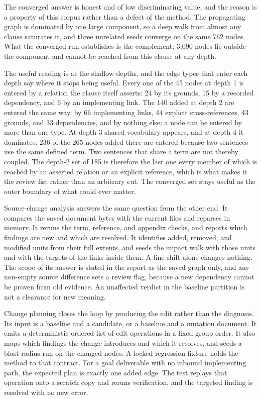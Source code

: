 The converged answer is honest and of low discriminating value, and the reason is a property of this corpus rather than a defect of the method. The propagating graph is dominated by one large component, so a deep walk from almost any clause saturates it, and three unrelated seeds converge on the same 762 nodes. What the converged run establishes is the complement: 3{,}090 nodes lie outside the component and cannot be reached from this clause at any depth.

The useful reading is at the shallow depths, and the edge types that enter each depth say where it stops being useful. Every one of the 45 nodes at depth 1 is entered by a relation the clause itself asserts: 24 by its grounds, 15 by a recorded dependency, and 6 by an implementing link. The 140 added at depth 2 are entered the same way, by 66 implementing links, 44 explicit cross-references, 43 grounds, and 33 dependencies, and by nothing else; a node can be entered by more than one type. At depth 3 shared vocabulary appears, and at depth 4 it dominates: 236 of the 265 nodes added there are entered because two sentences use the same defined term. Two sentences that share a term are not thereby coupled. The depth-2 set of 185 is therefore the last one every member of which is reached by an asserted relation or an explicit reference, which is what makes it the review list rather than an arbitrary cut. The converged set stays useful as the outer boundary of what could ever matter.

Source-change analysis answers the same question from the other end. It compares the saved document bytes with the current files and reparses in memory. It reruns the term, reference, and appendix checks, and reports which findings are new and which are resolved. It identifies added, removed, and modified units from their full extents, and seeds the impact walk with those units and with the targets of the links inside them. A line shift alone changes nothing. The scope of its answer is stated in the report as the saved graph only, and any non-empty source difference sets a review flag, because a new dependency cannot be proven from old evidence. An unaffected verdict in the baseline partition is not a clearance for new meaning.

Change planning closes the loop by producing the edit rather than the diagnosis. Its input is a baseline and a candidate, or a baseline and a mutation document. It emits a deterministic ordered list of edit operations in a fixed group order. It also maps which findings the change introduces and which it resolves, and seeds a blast-radius run on the changed nodes. A locked regression fixture holds the method to that contract. For a goal deliverable with no inbound implementing path, the expected plan is exactly one added edge. The test replays that operation onto a scratch copy and reruns verification, and the targeted finding is resolved with no new error.

